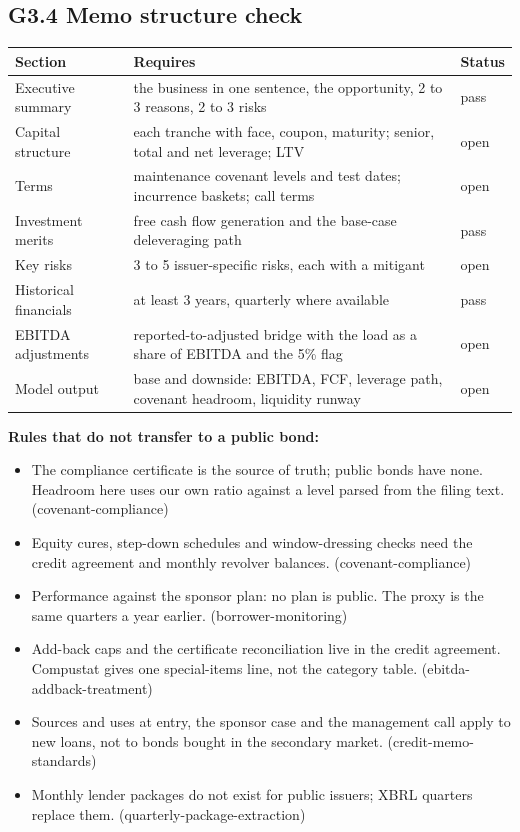 \documentclass[11pt,a4paper]{article}
\begin{document}
\subsection*{G3.4 Memo structure check}
\begin{center}\footnotesize\setlength{\tabcolsep}{3.5pt}\begin{tabular}{@{}lp{9cm}l@{}}\toprule
Section & Requires & Status \\\midrule
Executive summary & the business in one sentence, the opportunity, 2 to 3 reasons, 2 to 3 risks & \textcolor{good}{pass} \\
Capital structure & each tranche with face, coupon, maturity; senior, total and net leverage; LTV & \textcolor{amber}{open} \\
Terms & maintenance covenant levels and test dates; incurrence baskets; call terms & \textcolor{amber}{open} \\
Investment merits & free cash flow generation and the base-case deleveraging path & \textcolor{good}{pass} \\
Key risks & 3 to 5 issuer-specific risks, each with a mitigant & \textcolor{amber}{open} \\
Historical financials & at least 3 years, quarterly where available & \textcolor{good}{pass} \\
EBITDA adjustments & reported-to-adjusted bridge with the load as a share of EBITDA and the 5\% flag & \textcolor{amber}{open} \\
Model output & base and downside: EBITDA, FCF, leverage path, covenant headroom, liquidity runway & \textcolor{amber}{open} \\
\bottomrule\end{tabular}\end{center}
\textbf{Rules that do not transfer to a public bond:}\begin{itemize}\item The compliance certificate is the source of truth; public bonds have none. Headroom here uses our own ratio against a level parsed from the filing text. (covenant-compliance)\item Equity cures, step-down schedules and window-dressing checks need the credit agreement and monthly revolver balances. (covenant-compliance)\item Performance against the sponsor plan: no plan is public. The proxy is the same quarters a year earlier. (borrower-monitoring)\item Add-back caps and the certificate reconciliation live in the credit agreement. Compustat gives one special-items line, not the category table. (ebitda-addback-treatment)\item Sources and uses at entry, the sponsor case and the management call apply to new loans, not to bonds bought in the secondary market. (credit-memo-standards)\item Monthly lender packages do not exist for public issuers; XBRL quarters replace them. (quarterly-package-extraction)\end{itemize}
\end{document}
